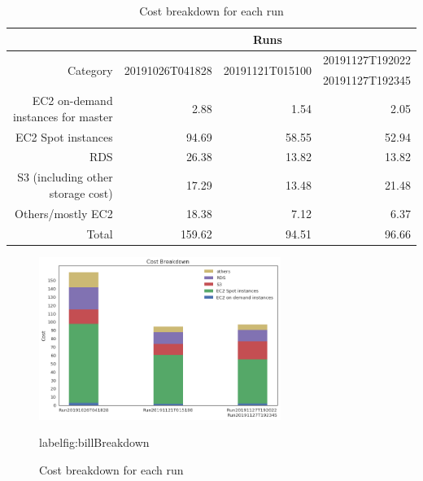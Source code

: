 \begin{table}[h!]
\centering
\begin{tabular} {|r|r|r|r|}
\hline
{}&\multicolumn{3}{c|}{Runs} \\ \hline
\multirow{2}{*}{Category}&\multirow{2}{*}{20191026T041828}&\multirow{2}{*}{20191121T015100}&{20191127T192022}\\
&&&{20191127T192345}\\ \hline
{EC2 on-demand instances for master}& 2.88 &1.54 &2.05\\
{EC2 Spot instances}&94.69&58.55 &52.94\\
{RDS}&26.38&13.82 & 13.82\\
{S3 (including other storage cost)}&17.29&13.48& 21.48\\
{Others/mostly EC2}&18.38 &7.12 &6.37\\ \hline
{Total}&159.62&94.51&96.66\\ \hline
\end{tabular} \normalsize
\caption{Cost breakdown for each run}
\label{tab:billBreakdown}
\end{table}

\begin{figure}[h]
\centering
\includegraphics[width=0.7\textwidth]{billBreakdown.png}
\caption{Cost breakdown for each run}
label{fig:billBreakdown}
\end{figure}

